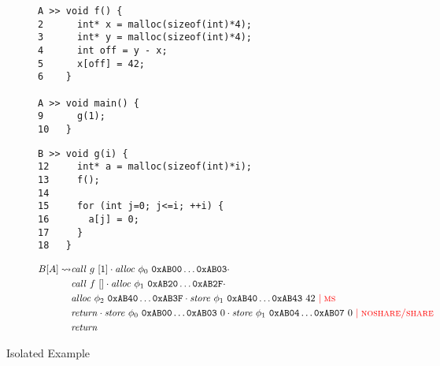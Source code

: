 \documentclass{article}
\begin{document}
\begin{figure}
  \begin{subfigure}{\textwidth}
    \begin{minipage}[t]{0.5\textwidth}
\begin{verbatim}
A >> void f() {
2      int* x = malloc(sizeof(int)*4);
3      int* y = malloc(sizeof(int)*4);
4      int off = y - x;
5      x[off] = 42;
6    }

A >> void main() {
9      g(1);
10   }
\end{verbatim}
    \end{minipage}
    \begin{minipage}[t]{0.4\textwidth}
\begin{verbatim}
B >> void g(i) {
12     int* a = malloc(sizeof(int)*i);
13     f();
14
15     for (int j=0; j<=i; ++i) {
16       a[j] = 0;
17     }
18   }
\end{verbatim}
    \end{minipage}
  \end{subfigure}
  \begin{subfigure}{\textwidth}
    \[\begin{split}
    B[A] \rightsquigarrow & \mathit{call} ~ g ~ [1] \cdot
    \mathit{alloc} ~ \phi_0 ~ \mathtt{0xAB00} \dots \mathtt{0xAB03} \cdot \\
    & \mathit{call} ~ f ~ [] \cdot
    \mathit{alloc} ~ \phi_1 ~ \mathtt{0xAB20} \dots \mathtt{0xAB2F} \cdot \\
    & \mathit{alloc} ~ \phi_2 ~ \mathtt{0xAB40} \dots \mathtt{0xAB3F} \cdot
    \mathit{store} ~ \phi_1 ~ \mathtt{0xAB40} \dots \mathtt{0xAB43} ~ 42 ~
           {\color{red} \mid \textnormal{\sc ms}} \\
    & \mathit{return} \cdot
           \mathit{store} ~ \phi_0 ~ \mathtt{0xAB00} \dots \mathtt{0xAB03} ~ 0 \cdot
    \mathit{store} ~ \phi_1 ~ \mathtt{0xAB04} \dots \mathtt{0xAB07} ~ 0 ~
           {\color{red} \mid \textnormal{\sc noshare/share}} \\
    & \mathit{return} \\
    \end{split}\]
  \end{subfigure}
  
  \caption{Isolated Example}
  \label{fig:isoexample1}
\end{figure}
\end{document}
